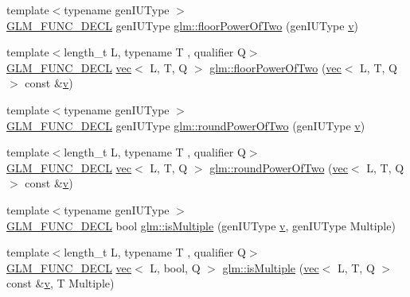 \begin{DoxyCompactItemize}
\item 
{\footnotesize template$<$typename gen\+I\+U\+Type $>$ }\\\mbox{\hyperlink{setup_8hpp_ab2d052de21a70539923e9bcbf6e83a51}{G\+L\+M\+\_\+\+F\+U\+N\+C\+\_\+\+D\+E\+CL}} gen\+I\+U\+Type \mbox{\hyperlink{group__gtc__round_gafe273a57935d04c9db677bf67f9a71f4}{glm\+::floor\+Power\+Of\+Two}} (gen\+I\+U\+Type \mbox{\hyperlink{_s_d_l__opengl_8h_a10a82eabcb59d2fcd74acee063775f90}{v}})
\item 
{\footnotesize template$<$length\+\_\+t L, typename T , qualifier Q$>$ }\\\mbox{\hyperlink{setup_8hpp_ab2d052de21a70539923e9bcbf6e83a51}{G\+L\+M\+\_\+\+F\+U\+N\+C\+\_\+\+D\+E\+CL}} \mbox{\hyperlink{structglm_1_1vec}{vec}}$<$ L, T, Q $>$ \mbox{\hyperlink{group__gtc__round_gaf0d591a8fca8ddb9289cdeb44b989c2d}{glm\+::floor\+Power\+Of\+Two}} (\mbox{\hyperlink{structglm_1_1vec}{vec}}$<$ L, T, Q $>$ const \&\mbox{\hyperlink{_s_d_l__opengl_8h_a10a82eabcb59d2fcd74acee063775f90}{v}})
\item 
{\footnotesize template$<$typename gen\+I\+U\+Type $>$ }\\\mbox{\hyperlink{setup_8hpp_ab2d052de21a70539923e9bcbf6e83a51}{G\+L\+M\+\_\+\+F\+U\+N\+C\+\_\+\+D\+E\+CL}} gen\+I\+U\+Type \mbox{\hyperlink{group__gtc__round_gae4e1bf5d1cd179f59261a7342bdcafca}{glm\+::round\+Power\+Of\+Two}} (gen\+I\+U\+Type \mbox{\hyperlink{_s_d_l__opengl_8h_a10a82eabcb59d2fcd74acee063775f90}{v}})
\item 
{\footnotesize template$<$length\+\_\+t L, typename T , qualifier Q$>$ }\\\mbox{\hyperlink{setup_8hpp_ab2d052de21a70539923e9bcbf6e83a51}{G\+L\+M\+\_\+\+F\+U\+N\+C\+\_\+\+D\+E\+CL}} \mbox{\hyperlink{structglm_1_1vec}{vec}}$<$ L, T, Q $>$ \mbox{\hyperlink{group__gtc__round_ga258802a7d55c03c918f28cf4d241c4d0}{glm\+::round\+Power\+Of\+Two}} (\mbox{\hyperlink{structglm_1_1vec}{vec}}$<$ L, T, Q $>$ const \&\mbox{\hyperlink{_s_d_l__opengl_8h_a10a82eabcb59d2fcd74acee063775f90}{v}})
\item 
{\footnotesize template$<$typename gen\+I\+U\+Type $>$ }\\\mbox{\hyperlink{setup_8hpp_ab2d052de21a70539923e9bcbf6e83a51}{G\+L\+M\+\_\+\+F\+U\+N\+C\+\_\+\+D\+E\+CL}} bool \mbox{\hyperlink{group__gtc__round_gaec593d33956a8fe43f78fccc63ddde9a}{glm\+::is\+Multiple}} (gen\+I\+U\+Type \mbox{\hyperlink{_s_d_l__opengl_8h_a10a82eabcb59d2fcd74acee063775f90}{v}}, gen\+I\+U\+Type Multiple)
\item 
{\footnotesize template$<$length\+\_\+t L, typename T , qualifier Q$>$ }\\\mbox{\hyperlink{setup_8hpp_ab2d052de21a70539923e9bcbf6e83a51}{G\+L\+M\+\_\+\+F\+U\+N\+C\+\_\+\+D\+E\+CL}} \mbox{\hyperlink{structglm_1_1vec}{vec}}$<$ L, bool, Q $>$ \mbox{\hyperlink{group__gtc__round_ga354caf634ef333d9cb4844407416256a}{glm\+::is\+Multiple}} (\mbox{\hyperlink{structglm_1_1vec}{vec}}$<$ L, T, Q $>$ const \&\mbox{\hyperlink{_s_d_l__opengl_8h_a10a82eabcb59d2fcd74acee063775f90}{v}}, T Multiple)

\end{DoxyCompactItemize}
